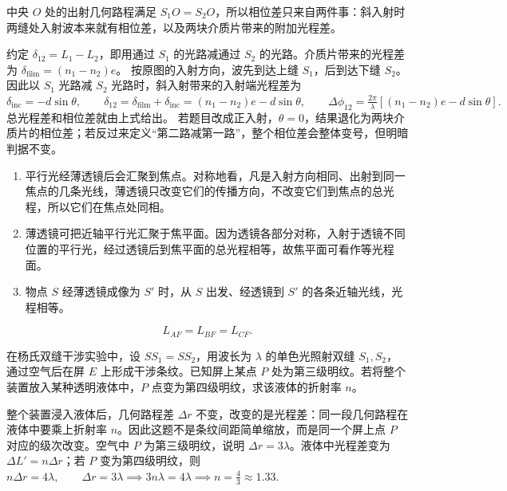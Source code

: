 \begin{solution}
中央 \(O\) 处的出射几何路程满足 \(S_1O=S_2O\)，所以相位差只来自两件事：斜入射时两缝处入射波本来就有相位差，以及两块介质片带来的附加光程差。

约定 \(\delta_{12}=L_1-L_2\)，即用通过 \(S_1\) 的光路减通过 \(S_2\) 的光路。介质片带来的光程差为 \(\delta_{\text{film}}=(n_1-n_2)e\)。
按原图的入射方向，波先到达上缝 \(S_1\)，后到达下缝 \(S_2\)。因此以 \(S_1\) 光路减 \(S_2\) 光路时，斜入射带来的入射端光程差为
 \(\delta_{\text{inc}}=-d\sin\theta,\qquad \delta_{12}=\delta_{\text{film}}+\delta_{\text{inc}} =(n_1-n_2)e-d\sin\theta,\qquad \Delta\phi_{12}=\frac{2\pi}{\lambda}\left[(n_1-n_2)e-d\sin\theta\right].\) 
总光程差和相位差就由上式给出。
若题目改成正入射，\(\theta=0\)，结果退化为两块介质片的相位差；若反过来定义“第二路减第一路”，整个相位差会整体变号，但明暗判据不变。
\end{solution}

\begin{theorem}[薄透镜的等光程性]
\begin{enumerate}
    \item 平行光经薄透镜后会汇聚到焦点。对称地看，凡是入射方向相同、出射到同一焦点的几条光线，薄透镜只改变它们的传播方向，不改变它们到焦点的总光程，所以它们在焦点处同相。
    \item 薄透镜可把近轴平行光汇聚于焦平面。因为透镜各部分对称，入射于透镜不同位置的平行光，经过透镜后到焦平面的总光程相等，故焦平面可看作等光程面。
    \item 物点 \(S\) 经薄透镜成像为 \(S'\) 时，从 \(S\) 出发、经透镜到 \(S'\) 的各条近轴光线，光程相等。
\end{enumerate}
\[
L_{AF}=L_{BF}=L_{CF}.
\]
\end{theorem}

\begin{exercise}
在杨氏双缝干涉实验中，设 \(SS_1=SS_2\)，用波长为 \(\lambda\) 的单色光照射双缝 \(S_1,S_2\)，通过空气后在屏 \(E\) 上形成干涉条纹。已知屏上某点 \(P\) 处为第三级明纹。若将整个装置放入某种透明液体中，\(P\) 点变为第四级明纹，求该液体的折射率 \(n\)。
\end{exercise}

\begin{solution}
整个装置浸入液体后，几何路程差 \(\Delta r\) 不变，改变的是光程差：同一段几何路程在液体中要乘上折射率 \(n\)。因此这题不是条纹间距简单缩放，而是同一个屏上点 \(P\) 对应的级次改变。空气中 \(P\) 为第三级明纹，说明 \(\Delta r=3\lambda\)。液体中光程差变为 \(\Delta L'=n\Delta r\)；若 \(P\) 变为第四级明纹，则
 \(n\Delta r=4\lambda,\qquad \Delta r=3\lambda \implies 3n\lambda=4\lambda \implies n=\frac43\approx 1.33.\) 
\end{solution}


